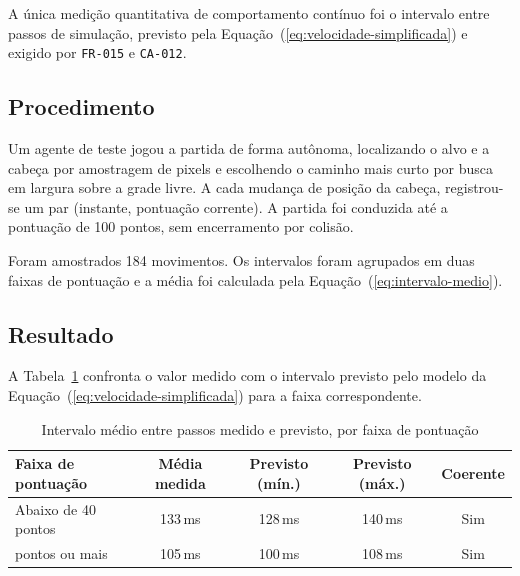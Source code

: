 A única medição quantitativa de comportamento contínuo foi o intervalo entre
passos de simulação, previsto pela Equação~(\ref{eq:velocidade-simplificada}) e
exigido por \texttt{FR-015} e \texttt{CA-012}.

\subsection{Procedimento}
\label{subsec:res-procedimento}

Um agente de teste jogou a partida de forma autônoma, localizando o alvo e a
cabeça por amostragem de pixels e escolhendo o caminho mais curto por busca em
largura sobre a grade livre. A cada mudança de posição da cabeça, registrou-se um
par (instante, pontuação corrente). A partida foi conduzida até a pontuação de
100 pontos, sem encerramento por colisão.

Foram amostrados 184 movimentos. Os intervalos foram agrupados em duas faixas de
pontuação e a média foi calculada pela Equação~(\ref{eq:intervalo-medio}).

\subsection{Resultado}
\label{subsec:res-resultado-velocidade}

A Tabela~\ref{tab:velocidade} confronta o valor medido com o intervalo previsto
pelo modelo da Equação~(\ref{eq:velocidade-simplificada}) para a faixa
correspondente.

\begin{table}[htb]
	\caption{Intervalo médio entre passos medido e previsto, por faixa de pontuação}
	\label{tab:velocidade}
	\centering
	\footnotesize
	\begin{tabularx}{\textwidth}{@{}p{3.2cm} c c c c@{}}
		\toprule
		\textbf{Faixa de pontuação} & \textbf{Média medida} & \textbf{Previsto (mín.)} & \textbf{Previsto (máx.)} & \textbf{Coerente} \\
		\midrule
		Abaixo de 40 pontos & 133\,ms & 128\,ms & 140\,ms & Sim \\
		\addlinespace
		80 pontos ou mais & 105\,ms & 100\,ms & 108\,ms & Sim \\
		\bottomrule
	\end{tabularx}
\end{table}


